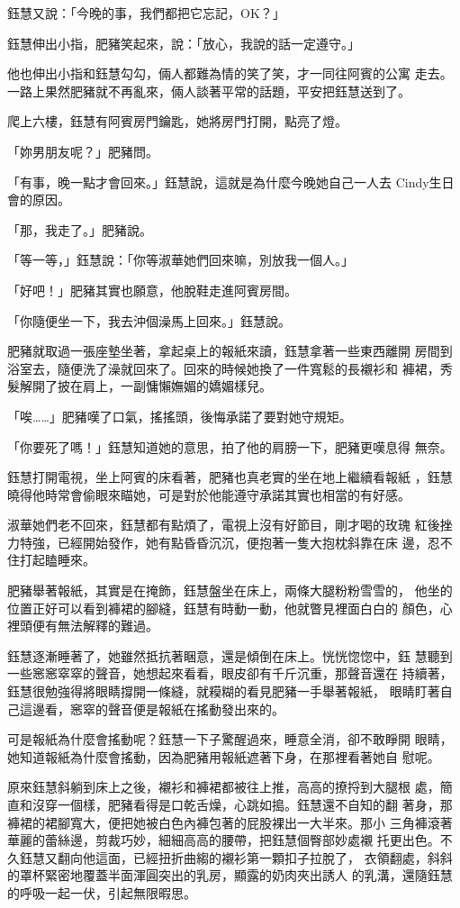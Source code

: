 鈺慧又說：「今晚的事，我們都把它忘記，OK？」

鈺慧伸出小指，肥豬笑起來，說：「放心，我說的話一定遵守。」

他也伸出小指和鈺慧勾勾，倆人都難為情的笑了笑，才一同往阿賓的公寓
走去。一路上果然肥豬就不再亂來，倆人談著平常的話題，平安把鈺慧送到了。

爬上六樓，鈺慧有阿賓房門鑰匙，她將房門打開，點亮了燈。

「妳男朋友呢？」肥豬問。

「有事，晚一點才會回來。」鈺慧說，這就是為什麼今晚她自己一人去
Cindy生日會的原因。

「那，我走了。」肥豬說。

「等一等，」鈺慧說：「你等淑華她們回來嘛，別放我一個人。」

「好吧！」肥豬其實也願意，他脫鞋走進阿賓房間。

「你隨便坐一下，我去沖個澡馬上回來。」鈺慧說。

肥豬就取過一張座墊坐著，拿起桌上的報紙來讀，鈺慧拿著一些東西離開
房間到浴室去，隨便洗了澡就回來了。回來的時候她換了一件寬鬆的長襯衫和
褲裙，秀髮解開了披在肩上，一副慵懶嫵媚的嬌媚樣兒。

「唉……」肥豬嘆了口氣，搖搖頭，後悔承諾了要對她守規矩。

「你要死了嗎！」鈺慧知道她的意思，拍了他的肩膀一下，肥豬更嘆息得
無奈。

鈺慧打開電視，坐上阿賓的床看著，肥豬也真老實的坐在地上繼續看報紙
，鈺慧曉得他時常會偷眼來瞄她，可是對於他能遵守承諾其實也相當的有好感。

淑華她們老不回來，鈺慧都有點煩了，電視上沒有好節目，剛才喝的玫瑰
紅後挫力特強，已經開始發作，她有點昏昏沉沉，便抱著一隻大抱枕斜靠在床
邊，忍不住打起瞌睡來。

肥豬舉著報紙，其實是在掩飾，鈺慧盤坐在床上，兩條大腿粉粉雪雪的，
他坐的位置正好可以看到褲裙的腳縫，鈺慧有時動一動，他就瞥見裡面白白的
顏色，心裡頭便有無法解釋的難過。

鈺慧逐漸睡著了，她雖然抵抗著睏意，還是傾倒在床上。恍恍惚惚中，鈺
慧聽到一些窸窸窣窣的聲音，她想起來看看，眼皮卻有千斤沉重，那聲音還在
持續著，鈺慧很勉強得將眼睛撐開一條縫，就糢糊的看見肥豬一手舉著報紙，
眼睛盯著自己這邊看，窸窣的聲音便是報紙在搖動發出來的。

可是報紙為什麼會搖動呢？鈺慧一下子驚醒過來，睡意全消，卻不敢睜開
眼睛，她知道報紙為什麼會搖動，因為肥豬用報紙遮著下身，在那裡看著她自
慰呢。

原來鈺慧斜躺到床上之後，襯衫和褲裙都被往上推，高高的撩捋到大腿根
處，簡直和沒穿一個樣，肥豬看得是口乾舌燥，心跳如搗。鈺慧還不自知的翻
著身，那褲裙的裙腳寬大，便把她被白色內褲包著的屁股裸出一大半來。那小
三角褲滾著華麗的蕾絲邊，剪裁巧妙，細細高高的腰帶，把鈺慧個臀部妙處襯
托更出色。不久鈺慧又翻向他這面，已經扭折曲縐的襯衫第一顆扣子拉脫了，
衣領翻處，斜斜的罩杯緊密地覆蓋半面渾圓突出的乳房，顯露的奶肉夾出誘人
的乳溝，還隨鈺慧的呼吸一起一伏，引起無限暇思。

